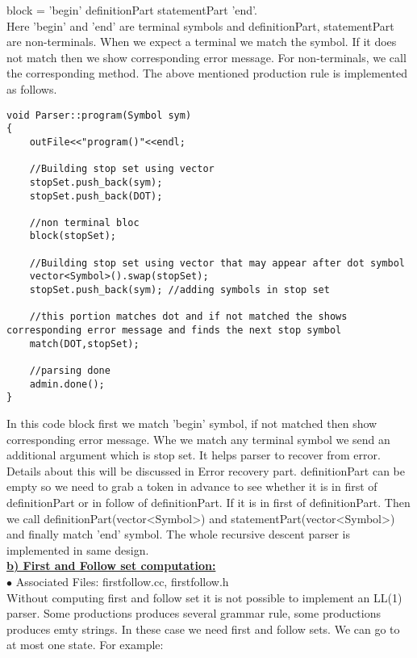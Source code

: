 \documentclass[paper=letter, fontsize=12pt]{scrartcl} %
\begin{document}
block = 'begin' definitionPart statementPart 'end'.\\

Here 'begin' and 'end' are terminal symbols and definitionPart, statementPart are non-terminals. When we expect a terminal we match the symbol. If it does not match then we show corresponding error message. For non-terminals, we call the corresponding method. The above mentioned production rule is implemented as follows.

\begin{lstlisting}
void Parser::program(Symbol sym)
{
	outFile<<"program()"<<endl;
	
	//Building stop set using vector		
	stopSet.push_back(sym);
	stopSet.push_back(DOT);
		
	//non terminal bloc	
	block(stopSet);	
	
	//Building stop set using vector that may appear after dot symbol
	vector<Symbol>().swap(stopSet);
	stopSet.push_back(sym); //adding symbols in stop set
	
	//this portion matches dot and if not matched the shows corresponding error message and finds the next stop symbol
	match(DOT,stopSet);
	
	//parsing done
	admin.done();
}

\end{lstlisting}

In this code block first we match 'begin' symbol, if not matched then show corresponding error message. Whe we match any terminal symbol we send an additional argument which is stop set. It helps parser to recover from error. Details about this will be discussed in Error recovery part. definitionPart can be empty so we need to grab a token in advance to see whether it is in first of definitionPart or in follow of definitionPart. If it is in first of definitionPart. Then we call definitionPart(vector<Symbol>) and statementPart(vector<Symbol>) and finally match 'end' symbol. The whole recursive descent parser is implemented in same design. \\

\underline {\bf b) First and Follow set computation:}\\

$\bullet$ Associated Files: firstfollow.cc, firstfollow.h\\

Without computing first and follow set it is not possible to implement an LL(1) parser. Some productions produces several grammar rule, some productions produces emty strings. In these case we need first and follow sets. We can go to at most one state. For example:\\
\end{document}
